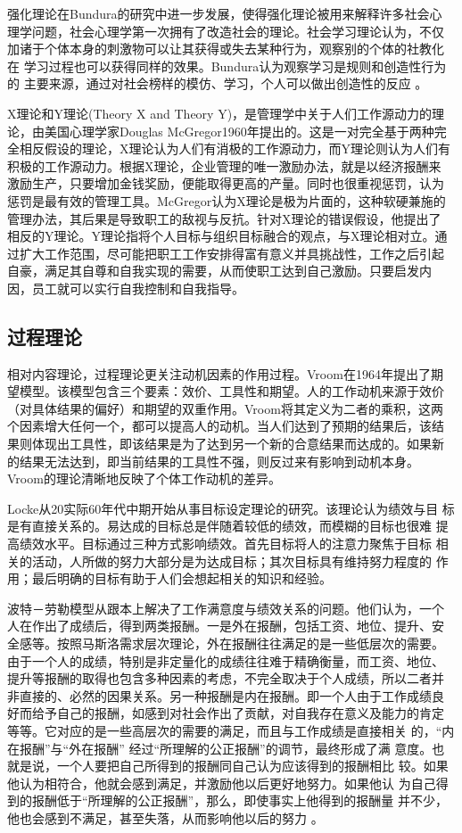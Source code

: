 \documentclass[12pt,a4paper]{ctexart}
\begin{document}
强化理论在Bundura的研究中进一步发展，使得强化理论被用来解释许多社会心
理学问题，社会心理学第一次拥有了改造社会的理论。社会学习理论认为，不仅
加诸于个体本身的刺激物可以让其获得或失去某种行为，观察别的个体的社教化
在
学习过程也可以获得同样的效果。Bundura认为观察学习是规则和创造性行为的
主要来源，通过对社会榜样的模仿、学习，个人可以做出创造性的反应
\cite{bundura1977slt}。

X理论和Y理论(Theory X and Theory Y)，是管理学中关于人们工作源动力的理
论，由美国心理学家Douglas McGregor1960年提出的。这是一对完全基于两种完
全相反假设的理论，X理论认为人们有消极的工作源动力，而Y理论则认为人们有
积极的工作源动力。根据X理论，企业管理的唯一激励办法，就是以经济报酬来
激励生产，只要增加金钱奖励，便能取得更高的产量。同时也很重视惩罚，认为
惩罚是最有效的管理工具。McGregor认为X理论是极为片面的，这种软硬兼施的
管理办法，其后果是导致职工的敌视与反抗。针对X理论的错误假设，他提出了
相反的Y理论。Y理论指将个人目标与组织目标融合的观点，与X理论相对立。通
过扩大工作范围，尽可能把职工工作安排得富有意义并具挑战性，工作之后引起
自豪，满足其自尊和自我实现的需要，从而使职工达到自己激励。只要启发内
因，员工就可以实行自我控制和自我指导\cite{mcgregor2006hse}。

\subsection{过程理论}
相对内容理论，过程理论更关注动机因素的作用过程。Vroom在1964年提出了期
望模型。该模型包含三个要素：效价、工具性和期望。人的工作动机来源于效价
（对具体结果的偏好）和期望的双重作用。Vroom将其定义为二者的乘积，这两
个因素增大任何一个，都可以提高人的动机。当人们达到了预期的结果后，该结
果则体现出工具性，即该结果是为了达到另一个新的合意结果而达成的。如果新
的结果无法达到，即当前结果的工具性不强，则反过来有影响到动机本身\cite{vroom1964wam}。
Vroom的理论清晰地反映了个体工作动机的差异。

Locke从20实际60年代中期开始从事目标设定理论的研究。该理论认为绩效与目
标是有直接关系的。易达成的目标总是伴随着较低的绩效，而模糊的目标也很难
提高绩效水平。目标通过三种方式影响绩效。首先目标将人的注意力聚焦于目标
相关的活动，人所做的努力大部分是为达成目标；其次目标具有维持努力程度的
作用；最后明确的目标有助于人们会想起相关的知识和经验\cite{locke1990tgs}。

波特－劳勒模型从跟本上解决了工作满意度与绩效关系的问题。他们认为，一个
人在作出了成绩后，得到两类报酬。一是外在报酬，包括工资、地位、提升、安
全感等。按照马斯洛需求层次理论，外在报酬往往满足的是一些低层次的需要。
由于一个人的成绩，特别是非定量化的成绩往往难于精确衡量，而工资、地位、
提升等报酬的取得也包含多种因素的考虑，不完全取决于个人成绩，所以二者并
非直接的、必然的因果关系。另一种报酬是内在报酬。即一个人由于工作成绩良
好而给予自己的报酬，如感到对社会作出了贡献，对自我存在意义及能力的肯定
等等。它对应的是一些高层次的需要的满足，而且与工作成绩是直接相关
的，“内在报酬”与“外在报酬” 经过“所理解的公正报酬”的调节，最终形成了满
意度。也就是说，一个人要把自己所得到的报酬同自己认为应该得到的报酬相比
较。如果他认为相符合，他就会感到满足，并激励他以后更好地努力。如果他认
为自己得到的报酬低于“所理解的公正报酬”，那么，即使事实上他得到的报酬量
并不少，他也会感到不满足，甚至失落，从而影响他以后的努力
\cite{porter1968maa}。 
\end{document}
